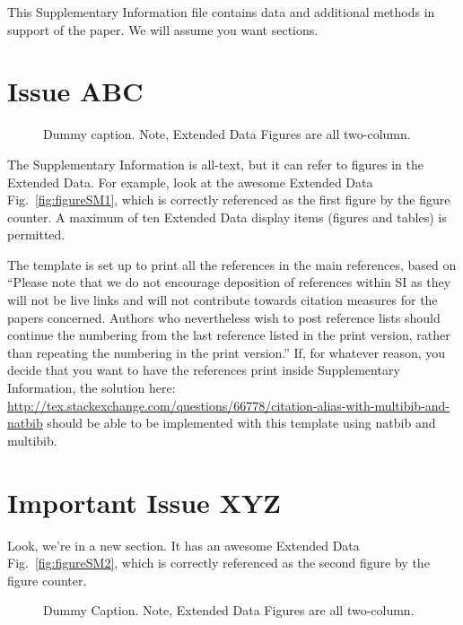 \newpage

\setlength{\parskip}{12pt}%



This Supplementary Information file contains data and additional methods in support of the paper. We will assume you want sections.

\section{Issue ABC}
\label{sec:ABC}

\begin{figure}[t]
\centerline{}
\caption{ Dummy caption. Note, Extended Data Figures are all two-column.}
\end{figure}

The Supplementary Information is all-text, but it can refer to figures in the Extended Data. For example, look at the awesome Extended Data Fig.~\ref{fig:figureSM1}, which is correctly referenced as the first figure by the figure counter. A maximum of ten Extended Data display items (figures and tables) is permitted.

The template is set up to print all the references in the main references, based on\cite{nsuppmat} ``Please note that we do not encourage deposition of references within SI as they will not be live links and will not contribute towards citation measures for the papers concerned. Authors who nevertheless wish to post reference lists should continue the numbering from the last reference listed in the print version, rather than repeating the numbering in the print version.'' If, for whatever reason, you decide that you want to have the references print inside Supplementary Information, the solution here: \url{http://tex.stackexchange.com/questions/66778/citation-alias-with-multibib-and-natbib} should be able to be implemented with this template using natbib and multibib.



\section{Important Issue XYZ}
\label{sec:XYZ}

Look, we're in a new section. It has an awesome Extended Data Fig.~\ref{fig:figureSM2}, which is correctly referenced as the second figure by the figure counter.

\begin{figure}[t]
\centerline{}
\caption{ Dummy Caption. Note, Extended Data Figures are all two-column.}
\end{figure}






